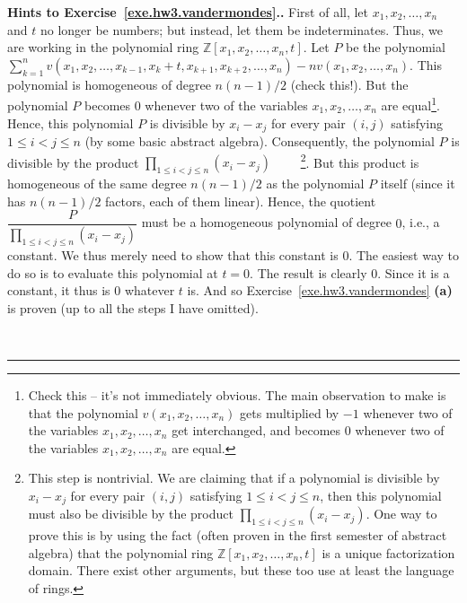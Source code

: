 \documentclass[numbers=enddot,12pt,final,onecolumn,notitlepage]{scrartcl}%
\theoremstyle{definition}
\newenvironment{proof}[1][Proof]{\noindent\textbf{#1.} }{\ \rule{0.5em}{0.5em}}
\let\sumnonlimits\sum
\let\prodnonlimits\prod
\renewcommand{\sum}{\sumnonlimits\limits}
\renewcommand{\prod}{\prodnonlimits\limits}
\newcommand{\ZZ}{\mathbb{Z}}
\newcommand{\tup}[1]{\left( #1 \right)}
\begin{document}
\begin{proof}[Hints to Exercise~\ref{exe.hw3.vandermondes}.]
First of all, let $x_1, x_2, \ldots, x_n$ and $t$ no longer be
numbers; but instead, let them be indeterminates.
Thus, we are working in the polynomial ring
$\ZZ\left[x_1, x_2, \ldots, x_n, t\right]$.
Let $P$ be the polynomial
$\sum_{k=1}^{n} v\left(  x_{1},x_{2},\ldots,x_{k-1},x_{k}+t,x_{k+1}%
,x_{k+2},\ldots,x_{n}\right)
- n v\left(  x_{1},x_{2},\ldots,x_{n}\right)$.
This polynomial is homogeneous of degree $n \tup{n-1} / 2$ (check
this!).
But the polynomial $P$ becomes $0$ whenever two of the variables
$x_1, x_2, \ldots, x_n$ are
equal\footnote{Check this -- it's not immediately obvious.
  The main observation to make is that the polynomial
  $v \tup{x_1, x_2, \ldots, x_n}$ gets multiplied by $-1$ whenever two
  of the variables $x_1, x_2, \ldots, x_n$ get interchanged, and
  becomes $0$ whenever two of the variables $x_1, x_2, \ldots, x_n$
  are equal.}.
Hence, this polynomial $P$ is divisible by $x_i - x_j$ for every pair
$\tup{i, j}$ satisfying $1 \leq i < j \leq n$ (by some basic abstract
algebra). Consequently, the polynomial $P$ is divisible by the
product
$\prod_{1 \leq i < j \leq n} \tup{x_i - x_j}$
\ \ \ \ \footnote{This step is nontrivial.
  We are claiming that if a polynomial is divisible by
  $x_i - x_j$ for every pair $\tup{i, j}$ satisfying
  $1 \leq i < j \leq n$, then this polynomial must also be divisible
  by the product $\prod_{1 \leq i < j \leq n} \tup{x_i - x_j}$.
  One way to prove this is by using the fact (often proven in the
  first semester of abstract algebra) that the polynomial ring
  $\ZZ\left[x_1, x_2, \ldots, x_n, t\right]$ is a unique factorization
  domain.
  There exist other arguments, but these too use at least the language
  of rings.}.
But this product is homogeneous of the same degree $n \tup{n-1} / 2$
as the polynomial $P$ itself (since it has $n \tup{n-1} / 2$ factors,
each of them linear).
Hence, the quotient
$\dfrac{P}{\prod_{1 \leq i < j \leq n} \tup{x_i - x_j}}$ must be a
homogeneous polynomial of degree $0$, i.e., a constant.
We thus merely need to show that this constant is $0$.
The easiest way to do so is to evaluate this polynomial at $t = 0$.
The result is clearly $0$.
Since it is a constant, it thus is $0$ whatever $t$ is.
And so Exercise~\ref{exe.hw3.vandermondes} \textbf{(a)} is proven
(up to all the steps I have omitted).


\end{proof}
\end{document}
